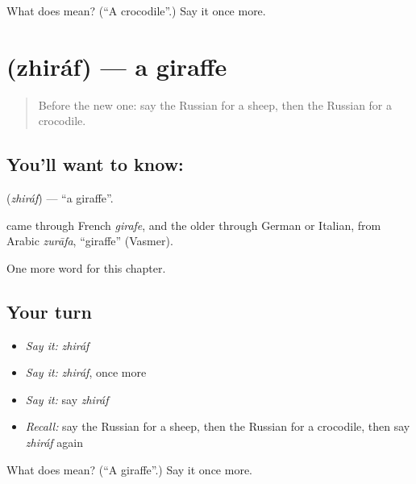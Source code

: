\begin{tcolorbox}[breakable,colback=teal!4,colframe=teal!35!black,title={Before you move on}]
What does  mean? (\textquotedblleft{}A crocodile\textquotedblright{}.) Say it once more.
\end{tcolorbox}
\section[\texorpdfstring{\ru{жираф} (zhiráf)}{жираф (zhiráf)}]{ (zhiráf) — a giraffe}

\label{lesson:RU-C225-zhiraf}



\begin{quote}
Before the new one: say the Russian for a sheep, then the Russian for a crocodile.
\end{quote}

\subsection*{You'll want to know: }
\textbf{} (\emph{zhiráf}) — \textquotedblleft{}a giraffe\textquotedblright{}.

\begin{cousinweb}
\textbf{} came through French \emph{girafe}, and the older \emph{} through German or Italian, from Arabic \emph{zurāfa}, \textquotedblleft{}giraffe\textquotedblright{} (Vasmer).
\end{cousinweb}

\begin{grammarlens}[title={What you've built}]
One more word for this chapter.
\end{grammarlens}

\subsection*{Your turn}
\begin{itemize}
\raggedright
  \item \emph{Say it:} \emph{zhiráf}
  \item \emph{Say it:} \emph{zhiráf}, once more
  \item \emph{Say it:} say \emph{zhiráf}
  \item \emph{Recall:} say the Russian for a sheep, then the Russian for a crocodile, then say \emph{zhiráf} again
\end{itemize}

\begin{tcolorbox}[breakable,colback=teal!4,colframe=teal!35!black,title={Before you move on}]
What does  mean? (\textquotedblleft{}A giraffe\textquotedblright{}.) Say it once more.
\end{tcolorbox}
